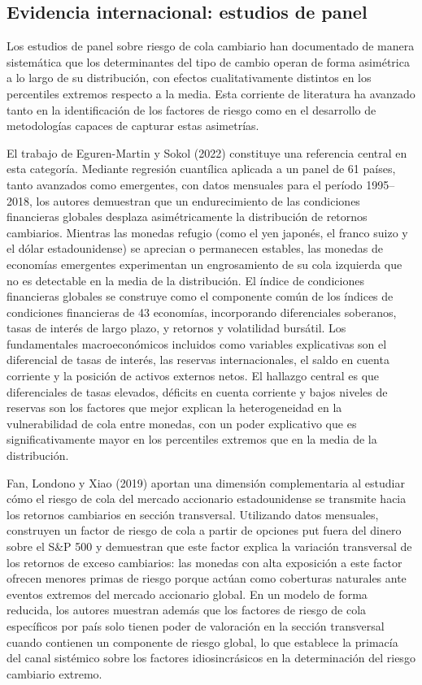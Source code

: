 ﻿\documentclass[11pt,a4paper]{article}
\begin{document}
\subsection{Evidencia internacional: estudios de panel}

Los estudios de panel sobre riesgo de cola cambiario han documentado de manera sistemática que los determinantes del tipo de cambio operan de forma asimétrica a lo largo de su distribución, con efectos cualitativamente distintos en los percentiles extremos respecto a la media. Esta corriente de literatura ha avanzado tanto en la identificación de los factores de riesgo como en el desarrollo de metodologías capaces de capturar estas asimetrías.


El trabajo de Eguren-Martin y Sokol (2022) constituye una referencia central en esta categoría. Mediante regresión cuantílica aplicada a un panel de 61 países, tanto avanzados como emergentes, con datos mensuales para el período 1995–2018, los autores demuestran que un endurecimiento de las condiciones financieras globales desplaza asimétricamente la distribución de retornos cambiarios. Mientras las monedas refugio (como el yen japonés, el franco suizo y el dólar estadounidense) se aprecian o permanecen estables, las monedas de economías emergentes experimentan un engrosamiento de su cola izquierda que no es detectable en la media de la distribución. El índice de condiciones financieras globales se construye como el componente común de los índices de condiciones financieras de 43 economías, incorporando diferenciales soberanos, tasas de interés de largo plazo, y retornos y volatilidad bursátil. Los fundamentales macroeconómicos incluidos como variables explicativas son el diferencial de tasas de interés, las reservas internacionales, el saldo en cuenta corriente y la posición de activos externos netos. El hallazgo central es que diferenciales de tasas elevados, déficits en cuenta corriente y bajos niveles de reservas son los factores que mejor explican la heterogeneidad en la vulnerabilidad de cola entre monedas, con un poder explicativo que es significativamente mayor en los percentiles extremos que en la media de la distribución.


Fan, Londono y Xiao (2019) aportan una dimensión complementaria al estudiar cómo el riesgo de cola del mercado accionario estadounidense se transmite hacia los retornos cambiarios en sección transversal. Utilizando datos mensuales, construyen un factor de riesgo de cola a partir de opciones put fuera del dinero sobre el S\&P 500 y demuestran que este factor explica la variación transversal de los retornos de exceso cambiarios: las monedas con alta exposición a este factor ofrecen menores primas de riesgo porque actúan como coberturas naturales ante eventos extremos del mercado accionario global. En un modelo de forma reducida, los autores muestran además que los factores de riesgo de cola específicos por país solo tienen poder de valoración en la sección transversal cuando contienen un componente de riesgo global, lo que establece la primacía del canal sistémico sobre los factores idiosincrásicos en la determinación del riesgo cambiario extremo.
\end{document}
